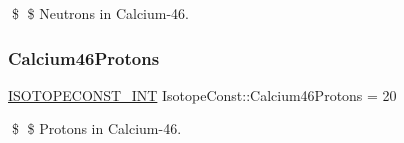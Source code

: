 \$ \$ Neutrons in Calcium-\/46. \mbox{\label{group___isotope_const-_calcium-_ca46_gaa5333454f2bf98fdbdb0a2654318e68e}} 
\subsubsection{\texorpdfstring{Calcium46\+Protons}{Calcium46Protons}}
{\footnotesize\ttfamily \mbox{\hyperlink{group___isotope_const-_macros_ga5f18360b3e99483a35c32d789e62621c}{I\+S\+O\+T\+O\+P\+E\+C\+O\+N\+S\+T\+\_\+\+I\+NT}} Isotope\+Const\+::\+Calcium46\+Protons = 20}

\$ \$ Protons in Calcium-\/46. 